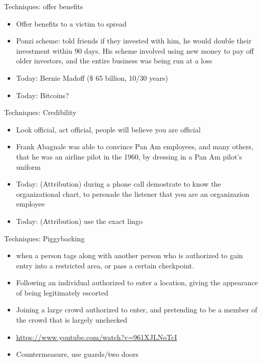 \documentclass{beamer}
\begin{document}
\begin{frame}{Techniques: offer benefits}
  \begin{itemize}
    \item Offer benefits to a victim to spread
    \item Ponzi scheme:  told friends if they invested with him, he
      would double their investment within 90 days. His scheme
      involved using new money to pay off older investors, and the
      entire business was being run at a loss
    \item Today: Bernie Madoff ($\$$ 65 billion, 10/30 years)
    \item<2-> Today: Bitcoins?
  \end{itemize}
\end{frame}

\begin{frame}{Techniques: Credibility}
  \begin{itemize}
    \item Look official, act official, people will believe you are official
    \item Frank Abagnale was able to
      convince Pan Am employees, and many others, that he was an
      airline pilot in the 1960, by dressing in a Pan Am pilot's uniform
    \item<2-> Today: (Attribution) during a phone call demostrate to know
      the organizational chart, to persuade the listener that you are
      an organizazion employee
    \item<2-> Today: (Attribution) use the exact lingo
  \end{itemize}
\end{frame}


\begin{frame}{Techniques: Piggybacking}

  \begin{itemize}
    \item when a person tags along with
another person who is authorized to gain entry into a restricted area,
or pass a certain checkpoint.
    \item Following an individual authorized to enter
      a location, giving the appearance of being legitimately escorted
    \item Joining a large crowd authorized to enter, and pretending to
      be a member of the crowd that is largely unchecked
    \item \url{https://www.youtube.com/watch?v=961XJLNoTcI}
    \item Countermeasure, use guards/two doors
  \end{itemize}
\end{frame}
\end{document}
